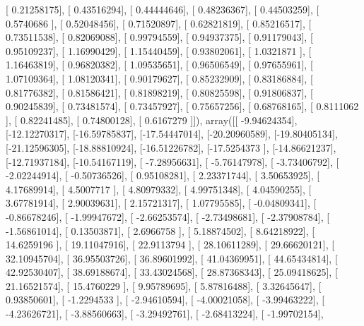 \documentclass{article}
\begin{document}
       [ 0.21258175],
       [ 0.43516294],
       [ 0.44444646],
       [ 0.48236367],
       [ 0.44503259],
       [ 0.5740686 ],
       [ 0.52048456],
       [ 0.71520897],
       [ 0.62821819],
       [ 0.85216517],
       [ 0.73511538],
       [ 0.82069088],
       [ 0.99794559],
       [ 0.94937375],
       [ 0.91179043],
       [ 0.95109237],
       [ 1.16990429],
       [ 1.15440459],
       [ 0.93802061],
       [ 1.0321871 ],
       [ 1.16463819],
       [ 0.96820382],
       [ 1.09535651],
       [ 0.96506549],
       [ 0.97655961],
       [ 1.07109364],
       [ 1.08120341],
       [ 0.90179627],
       [ 0.85232909],
       [ 0.83186884],
       [ 0.81776382],
       [ 0.81586421],
       [ 0.81898219],
       [ 0.80825598],
       [ 0.91806837],
       [ 0.90245839],
       [ 0.73481574],
       [ 0.73457927],
       [ 0.75657256],
       [ 0.68768165],
       [ 0.8111062 ],
       [ 0.82241485],
       [ 0.74800128],
       [ 0.6167279 ]]), array([[ -9.94624354],
       [-12.12270317],
       [-16.59785837],
       [-17.54447014],
       [-20.20960589],
       [-19.80405134],
       [-21.12596305],
       [-18.88810924],
       [-16.51226782],
       [-17.5254373 ],
       [-14.86621237],
       [-12.71937184],
       [-10.54167119],
       [ -7.28956631],
       [ -5.76147978],
       [ -3.73406792],
       [ -2.02244914],
       [ -0.50736526],
       [  0.95108281],
       [  2.23371744],
       [  3.50653925],
       [  4.17689914],
       [  4.5007717 ],
       [  4.80979332],
       [  4.99751348],
       [  4.04590255],
       [  3.67781914],
       [  2.90039631],
       [  2.15721317],
       [  1.07795585],
       [ -0.04809341],
       [ -0.86678246],
       [ -1.99947672],
       [ -2.66253574],
       [ -2.73498681],
       [ -2.37908784],
       [ -1.56861014],
       [  0.13503871],
       [  2.6966758 ],
       [  5.18874502],
       [  8.64218922],
       [ 14.6259196 ],
       [ 19.11047916],
       [ 22.9113794 ],
       [ 28.10611289],
       [ 29.66620121],
       [ 32.10945704],
       [ 36.95503726],
       [ 36.89601992],
       [ 41.04369951],
       [ 44.65434814],
       [ 42.92530407],
       [ 38.69188674],
       [ 33.43024568],
       [ 28.87368343],
       [ 25.09418625],
       [ 21.16521574],
       [ 15.4760229 ],
       [  9.95789695],
       [  5.87816488],
       [  3.32645647],
       [  0.93850601],
       [ -1.2294533 ],
       [ -2.94610594],
       [ -4.00021058],
       [ -3.99463222],
       [ -4.23626721],
       [ -3.88560663],
       [ -3.29492761],
       [ -2.68413224],
       [ -1.99702154],
\end{document}
